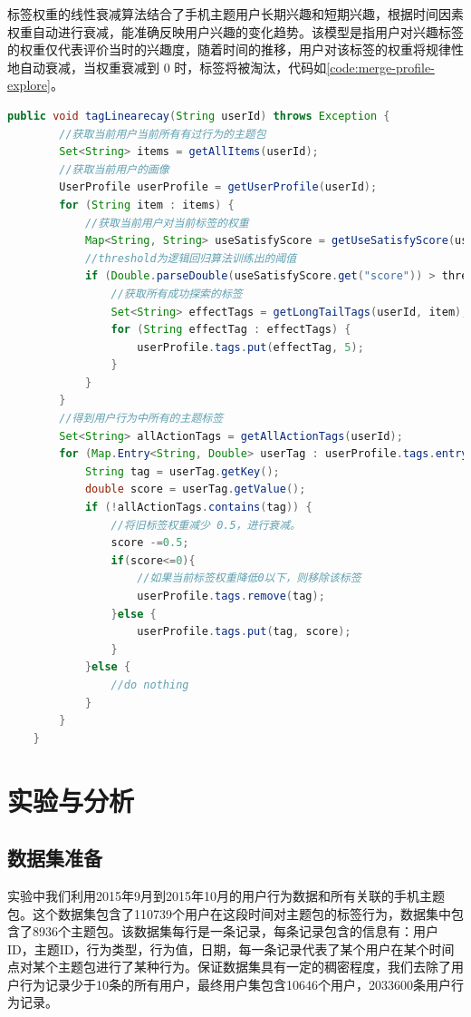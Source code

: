   标签权重的线性衰减算法结合了手机主题用户长期兴趣和短期兴趣，根据时间因素权重自动进行衰减，能准确反映用户兴趣的变化趋势。该模型是指用户对兴趣标签的权重仅代表评价当时的兴趣度，随着时间的推移，用户对该标签的权重将规律性地自动衰减，当权重衰减到 0 时，标签将被淘汰，代码如\autoref{code:merge-profile-explore}。
  \begin{lstlisting}[language=java,firstnumber=1,label={code:merge-profile-explore}, caption={标签权重的线性衰减算法}]
      public void tagLinearecay(String userId) throws Exception {
        //获取当前用户当前所有有过行为的主题包
        Set<String> items = getAllItems(userId);
        //获取当前用户的画像
        UserProfile userProfile = getUserProfile(userId);
        for (String item : items) {
            //获取当前用户对当前标签的权重
            Map<String, String> useSatisfyScore = getUseSatisfyScore(userId, item);
            //threshold为逻辑回归算法训练出的阈值
            if (Double.parseDouble(useSatisfyScore.get("score")) > threshold) {
                //获取所有成功探索的标签
                Set<String> effectTags = getLongTailTags(userId, item);
                for (String effectTag : effectTags) {
                    userProfile.tags.put(effectTag, 5);
                }
            }
        }
        //得到用户行为中所有的主题标签
        Set<String> allActionTags = getAllActionTags(userId);
        for (Map.Entry<String, Double> userTag : userProfile.tags.entrySet()) {
            String tag = userTag.getKey();
            double score = userTag.getValue();
            if (!allActionTags.contains(tag)) {
                //将旧标签权重减少 0.5，进行衰减。
                score -=0.5;
                if(score<=0){
                    //如果当前标签权重降低0以下，则移除该标签
                    userProfile.tags.remove(tag);  
                }else {
                    userProfile.tags.put(tag, score);
                }
            }else {
                //do nothing
            }
        }
    }
  \end{lstlisting}


\section{实验与分析}
  \subsection{数据集准备}
  实验中我们利用2015年9月到2015年10月的用户行为数据和所有关联的手机主题包。这个数据集包含了110739个用户在这段时间对主题包的标签行为，数据集中包含了8936个主题包。该数据集每行是一条记录，每条记录包含的信息有：用户ID，主题ID，行为类型，行为值，日期，每一条记录代表了某个用户在某个时间点对某个主题包进行了某种行为。保证数据集具有一定的稠密程度，我们去除了用户行为记录少于10条的所有用户，最终用户集包含10646个用户，2033600条用户行为记录。
